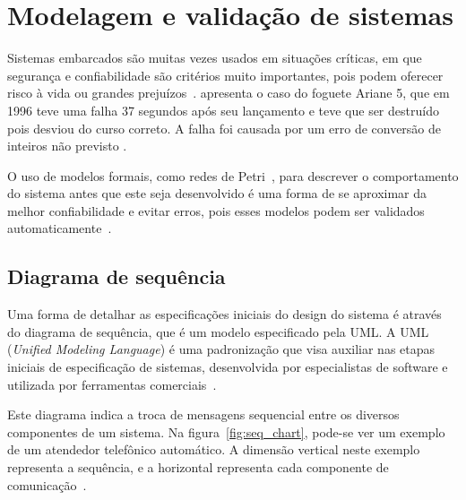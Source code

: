 \section{Modelagem e validação de sistemas}\label{sec:modelosformais}

Sistemas embarcados são muitas vezes usados em situações críticas, em que segurança e confiabilidade são critérios muito importantes, pois podem oferecer risco à vida ou grandes prejuízos~\cite{edwards:1997}.  apresenta o caso do foguete Ariane 5, que em 1996 teve uma falha 37 segundos após seu lançamento e teve que ser destruído pois desviou do curso correto. A falha foi causada por um erro de conversão de inteiros não previsto \cite{buttazzo2011:realtime}.

O uso de modelos formais, como redes de Petri~\cite{peterson:1981}, para descrever o comportamento do sistema antes que este seja desenvolvido é uma forma de se aproximar da melhor confiabilidade e evitar erros, pois esses modelos podem ser validados automaticamente~\cite{edwards:1997}.

\subsection{Diagrama de sequência}
Uma forma de detalhar as especificações iniciais do design do sistema é através do diagrama de sequência, que é um modelo especificado pela UML. A UML (\textit{Unified Modeling Language}) é uma padronização que visa auxiliar nas etapas iniciais de especificação de sistemas, desenvolvida por especialistas de software e utilizada por ferramentas comerciais~\cite{marwedel:2010}.

Este diagrama indica a troca de mensagens sequencial entre os diversos componentes de um sistema. Na figura~\ref{fig:seq_chart}, pode-se ver um exemplo de um atendedor telefônico automático. A dimensão vertical neste exemplo representa a sequência, e a horizontal representa cada componente de comunicação~\cite{marwedel:2010}.

